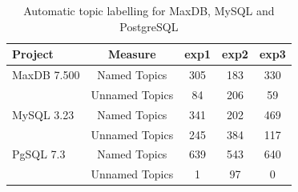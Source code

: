 \documentclass[smallextended]{svjour3}       %
\begin{document}
\begin{table}
\centering




\begin{tabular}{l|c|c|c|c}
\toprule
\textbf{Project} & \textbf{Measure} & \textsf{exp1} & \textsf{exp2} & \textsf{exp3} \\
\midrule
 MaxDB 7.500 & Named Topics   & 305 & 183 & 330 \\
             & Unnamed Topics & 84  & 206 & 59  \\
\midrule
 MySQL 3.23  & Named Topics   & 341 & 202 & 469 \\
             & Unnamed Topics & 245 & 384 & 117  \\
\midrule
 PgSQL 7.3   & Named Topics   & 639 & 543 & 640 \\
             & Unnamed Topics & 1   & 97  & 0  \\
\bottomrule
\end{tabular}
	\caption{Automatic topic labelling for MaxDB, MySQL and PostgreSQL}
	\label{tbl:wordlist}


\end{table}
\end{document}
